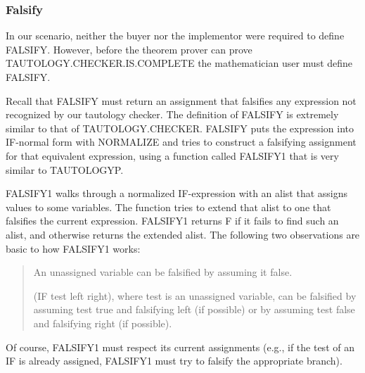\documentclass[11pt]{book}
\newenvironment{pubcrown}{\begin{quote}}{\end{quote}}
\newcommand{\pubdefaulttextsize}{\large}
\begin{document}
\subsubsection{Falsify}
\pubdefaulttextsize
In our scenario, neither the buyer nor the implementor were
required to define FALSIFY.  However, before the theorem prover can prove
TAU\-TOL\-OGY.CHECK\-ER.IS.COMPLETE the
mathematician user must define FALSIFY.

Recall that FALSIFY must return an assignment that falsifies any expression
not recognized by our tautology checker.
The definition of FAL\-SI\-FY is extremely similar to that of TAU\-TOL\-OGY.CHECK\-ER.  FAL\-SI\-FY
puts the expression into IF-normal form with NORMALIZE and
tries to construct a falsifying assignment for that equivalent
expression, using a function called FALSIFY1 that is
very similar to TAUTOLOGYP.

FALSIFY1 walks through a normalized IF-expression with an alist that
assigns values to some variables.  The function
tries to extend that alist to one that falsifies the current expression.
FALSIFY1 returns F if it
fails to find such an alist, and otherwise returns the
extended alist.  The following two observations
are basic to how FALSIFY1 works:
\begin{pubcrown}
An unassigned variable can be falsified by assuming it false.

(IF test left right), where test is an unassigned variable,
can be falsified by assuming test true and falsifying left (if possible)
or by assuming test false and falsifying right (if possible).
\end{pubcrown}
Of course, FALSIFY1 must respect its current assignments (e.g., if the
test of an IF is already assigned, FALSIFY1 must try to falsify the appropriate
branch).
\end{document}
